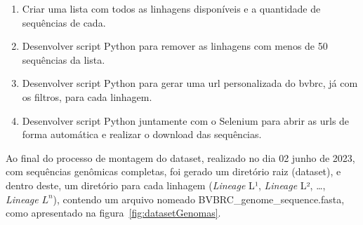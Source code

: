 \begin{enumerate}
  \item Criar uma lista com todos as linhagens disponíveis e a quantidade de sequências de cada.
  \item Desenvolver script Python para remover as linhagens com menos de 50 sequências da lista.
  \item Desenvolver script Python para gerar uma url personalizada do \gls{bvbrc}, já com os filtros, para cada linhagem.
  \item Desenvolver script Python juntamente com o Selenium para abrir as urls de forma automática e realizar o download das sequências.
\end{enumerate}

Ao final do processo de montagem do dataset, realizado no dia 02 junho de 2023, com sequências genômicas completas, foi gerado um diretório raiz (dataset), e dentro deste, um diretório para cada linhagem (\textit{Lineage} L¹, \textit{Lineage} L², \dots, \textit{Lineage} $L^{n}$), contendo um arquivo nomeado \textnormal{BVBRC\_genome\_sequence.fasta}, como apresentado na figura~\ref{fig:datasetGenomas}.

